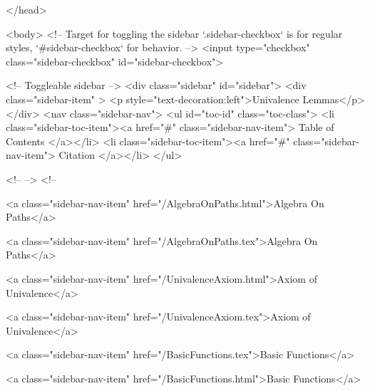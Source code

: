   
</head>




  <body>
    <!-- Target for toggling the sidebar `.sidebar-checkbox` is for regular
     styles, `#sidebar-checkbox` for behavior. -->
<input type="checkbox" class="sidebar-checkbox" id="sidebar-checkbox">

<!-- Toggleable sidebar -->
<div class="sidebar" id="sidebar">
  <div class="sidebar-item" >
    <p style="text-decoration:left">Univalence Lemmas</p>
  </div>
  <nav class="sidebar-nav">
    <ul id="toc-id" class="toc-class">
  <li class="sidebar-toc-item"><a href="#" class="sidebar-nav-item"> Table of Contents </a></li>
  <li class="sidebar-toc-item"><a href="#" class="sidebar-nav-item"> Citation </a></li>
</ul>


    <!--  -->
    <!-- 
      
    
      
    
      
    
      
        
      
    
      
        
          <a class="sidebar-nav-item" href="/AlgebraOnPaths.html">Algebra On Paths</a>
        
      
    
      
        
          <a class="sidebar-nav-item" href="/AlgebraOnPaths.tex">Algebra On Paths</a>
        
      
    
      
        
          <a class="sidebar-nav-item" href="/UnivalenceAxiom.html">Axiom of Univalence</a>
        
      
    
      
        
          <a class="sidebar-nav-item" href="/UnivalenceAxiom.tex">Axiom of Univalence</a>
        
      
    
      
        
          <a class="sidebar-nav-item" href="/BasicFunctions.tex">Basic Functions</a>
        
      
    
      
        
          <a class="sidebar-nav-item" href="/BasicFunctions.html">Basic Functions</a>
        
      
    
      
        
